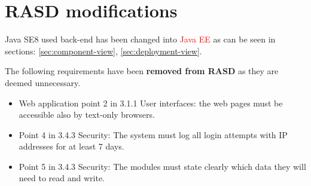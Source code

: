 \section{RASD modifications}
\label{sec:RASD-changes}

Java SE8 used back-end has been changed into \textcolor{red}{Java EE} as can be seen in sections: \ref{sec:component-view}, \ref{sec:deployment-view}.

The following requirements have been {\bf removed from RASD} as they are deemed unnecessary.
\begin{itemize}
\item Web application point 2 in 3.1.1 User interfaces: the web pages must be accessible also by text-only browsers.
\item Point 4 in 3.4.3 Security: The system must log all login attempts with IP addresses for at least 7 days.
\item Point 5 in 3.4.3 Security: The modules must state clearly which data they will need to read and write.
\end{itemize}










